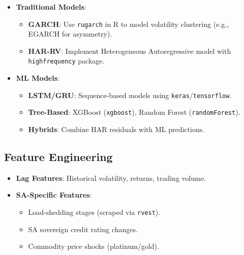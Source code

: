 \documentclass[11pt,preprint]{elsarticle}
\numberwithin{equation}{section}
\numberwithin{figure}{section}
\numberwithin{table}{section}
\def\tightlist{} %
\begin{document}
\begin{itemize}
\tightlist
\item
  \textbf{Traditional Models}:

  \begin{itemize}
  \tightlist
  \item
    \textbf{GARCH}: Use \texttt{rugarch} in R to model volatility
    clustering (e.g., EGARCH for asymmetry).\\
  \item
    \textbf{HAR-RV}: Implement Heterogeneous Autoregressive model with
    \texttt{highfrequency} package.\\
  \end{itemize}
\item
  \textbf{ML Models}:

  \begin{itemize}
  \tightlist
  \item
    \textbf{LSTM/GRU}: Sequence-based models using
    \texttt{keras}/\texttt{tensorflow}.\\
  \item
    \textbf{Tree-Based}: XGBoost (\texttt{xgboost}), Random Forest
    (\texttt{randomForest}).\\
  \item
    \textbf{Hybrids}: Combine HAR residuals with ML predictions.
  \end{itemize}
\end{itemize}

\subsection{Feature Engineering}\label{feature-engineering}

\begin{itemize}
\tightlist
\item
  \textbf{Lag Features}: Historical volatility, returns, trading
  volume.\\
\item
  \textbf{SA-Specific Features}:

  \begin{itemize}
  \tightlist
  \item
    Load-shedding stages (scraped via \texttt{rvest}).\\
  \item
    SA sovereign credit rating changes.\\
  \item
    Commodity price shocks (platinum/gold).
  \end{itemize}
\end{itemize}
\end{document}
